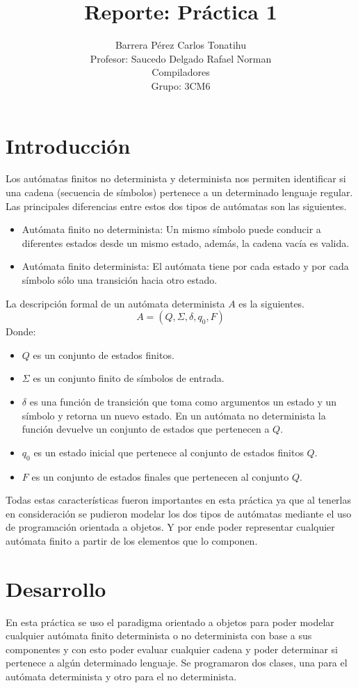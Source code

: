 \documentclass[16pt, titlepage]{article}
\title{Reporte: Práctica 1}
\author{Barrera Pérez Carlos Tonatihu \\ Profesor: Saucedo Delgado Rafael Norman \\ Compiladores \\ Grupo: 3CM6 }
\begin{document}
	\maketitle
	\tableofcontents
	
	\section{Introducción}
	Los autómatas finitos no determinista y determinista nos permiten identificar si una cadena (secuencia de símbolos) pertenece a un determinado lenguaje regular. Las principales diferencias entre estos dos tipos de autómatas son las siguientes.
	
	\begin{itemize}
		\item Autómata finito no determinista: Un mismo símbolo puede conducir a diferentes estados desde un mismo estado, además, la cadena vacía es valida.
		\item Autómata finito determinista: El autómata tiene por cada estado y por cada símbolo sólo una transición hacia otro estado.
	\end{itemize}

	La descripción formal de un autómata determinista $A$ es la siguientes.
	\[ A = (Q, \Sigma , \delta, q_{0}, F) \]
	Donde:
	
	\begin{itemize}
		\item $Q$ es un conjunto de estados finitos.
		\item $\Sigma$ es un conjunto finito de símbolos de entrada.
		\item $\delta$ es una función de transición que toma como argumentos un estado y un símbolo y retorna un nuevo estado. En un autómata no determinista la función devuelve un conjunto de estados que pertenecen a $Q$.
		\item $q_{0}$ es un estado inicial que pertenece al conjunto de estados finitos $Q$.
		\item $F$ es un conjunto de estados finales que pertenecen al conjunto $Q$.
	\end{itemize}

	Todas estas características fueron importantes en esta práctica ya que al tenerlas en consideración se pudieron modelar los dos tipos de autómatas mediante el uso de programación orientada a objetos. Y por ende poder representar cualquier autómata finito a partir de los elementos que lo componen.
	
	\section{Desarrollo}
	En esta práctica se uso el paradigma orientado a objetos para poder modelar cualquier autómata finito determinista o no determinista con base a sus componentes y con esto poder evaluar cualquier cadena y poder determinar si pertenece a algún determinado lenguaje.
	Se programaron dos clases, una para el autómata determinista y otro para el no determinista.
	
\end{document}
